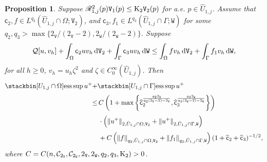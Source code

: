 \documentclass[reqno, 11pt, a4paper]{amsart}
\newtheorem{proposition}[theorem]{Proposition}
\numberwithin{equation}{section}
\newcommand{\ops}{\mathcal{Q}}
\newcommand{\xv}{2_{\mathtt{V}}}
\newcommand{\xw}{2_{\mathtt{W}}}
\newcommand{\ck}{\textnormal K}
\newcommand{\fc}{\mathsf c}
\newcommand{\wghtv}{\mathtt{V}}
\newcommand{\wghtw}{\mathtt{W}}
\newcommand{\dwv}{\textnormal{d} \mathtt{V}}
\newcommand{\dww}{\textnormal{d} \mathtt{W}}
\newcommand{\kp}{\mathscr{R}}
\newcommand{\pvr}{p}
\newcommand{\qxp}{q}
\begin{document}
 


\begin{proposition} \label{52}
Suppose $\kp _{1 , j} ^{2 } (\pvr) \wghtv _1 (\pvr )  \leq \ck _{2} \wghtv _2 (\pvr )$ for   a.e. $\pvr  \in \hat U _{1,j}$.  Assume that   $\fc _2, f \in L^{q_2} (\hat U _{1,j} \cap \Omega  ; \wghtv _2)$,  and  $\fc _3 , f_1 \in L^{q_3} (\hat U _{1,j} \cap \Gamma ; \wghtw)$  for some  $q _2, q_3 > \max \{ \xv / (\xv -2) , \xw / (\xw -2) \}$. Suppose  
\begin{equation*}
\begin{aligned}
 \ops [u,v_{h} ] + \int  _{\Omega } \fc _2 u v_{h}   \,  \dwv _{2}   + \int  _{ \Gamma }\fc _3 u v_{ h } \, \dww  
 \leq \int  _{\Omega }    f v_{ h } \,  \dwv _{2}  + \int_{\Gamma } f_1 v _{ h } \, \dww ,  
\end{aligned}
\end{equation*}
for all $h\geq 0 $,   $v _{ h }  = u_{ h }  \zeta ^2 $ and $\zeta \in C^{\infty} _0 ( \hat U_{1,j} )$. Then
\begin{align*}
 \stackbin[ U _{1,j} \cap \Omega ]{}{\operatorname{ess}\sup} \,   u^{+} + & \stackbin[ U_{1,j} \cap \Gamma ]{}{\operatorname{ess}\sup} \, u^{+} \\[3pt]
 \leq & \displaystyle \,  C\left(1+ \max \left\{   \widehat{\fc}_2^{\frac{\qxp _2 \xv }{\qxp _2 (\xv -2) - \xv}}   , \widehat{\fc}_3 ^{\frac{\qxp _3 \xw }{\qxp _3 (\xw -2) - \xw}} \right\}  \right)\\[3pt]
& \displaystyle \, \cdot \left(\Vert u^+ \Vert _{2 , \hat U _{1,j} \cap \Omega   , \wghtv _2}  +   \Vert  u^+ \Vert _{2 , \hat U _{1,j} \cap \Gamma    , \wghtw }  \right) \\[3pt]
& \displaystyle \, + C\left( \Vert f \Vert _{ q_2 ,  \hat U _{1,j} \cap \Omega    , \wghtv _2}  + \Vert f_1 \Vert _{q_3 , \hat U _{1,j} \cap \Gamma  , \wghtw} \right)(1+\widehat{\fc}_2 + \widehat{\fc}_3)^{-1/2},
\end{align*}
where  $C=C (  n , \mathcal C_{\xv} , \mathcal C_{\xw} ,  \xv , \xw , \qxp _2 , \qxp _3 , \ck _2) >0$.
\end{proposition}
\end{document}
